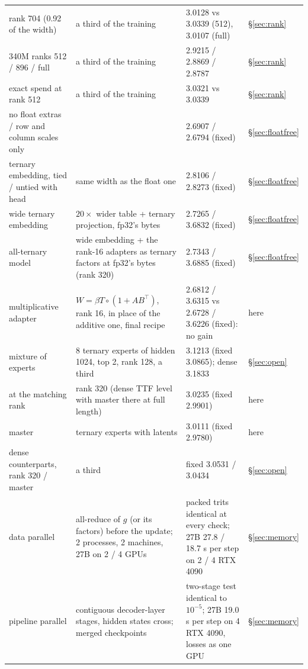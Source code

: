 \documentclass[10pt,twocolumn]{article}
\begin{document}
\begin{table}[t]
{\begin{tabular}{p{4.6cm}p{6.2cm}p{4.6cm}l}
rank 704 (0.92 of the width) & a third of the training & 3.0128 vs 3.0339 (512), 3.0107 (full) & \S\ref{sec:rank} \\
340M ranks 512 / 896 / full & a third of the training & 2.9215 / 2.8869 / 2.8787 & \S\ref{sec:rank} \\
exact spend at rank 512 & a third of the training & 3.0321 vs 3.0339 & \S\ref{sec:rank} \\
no float extras / row and column scales only & & 2.6907 / 2.6794 (fixed) & \S\ref{sec:floatfree} \\
ternary embedding, tied / untied with head & same width as the float one & 2.8106 / 2.8273 (fixed) & \S\ref{sec:floatfree} \\
wide ternary embedding & $20\times$ wider table + ternary projection, fp32's bytes & 2.7265 / 3.6832 (fixed) & \S\ref{sec:floatfree} \\
all-ternary model & wide embedding + the rank-16 adapters as ternary factors at fp32's bytes (rank 320) & 2.7343 / 3.6885 (fixed) & \S\ref{sec:floatfree} \\
multiplicative adapter & $W=\beta T\circ(1+AB^\top)$, rank 16, in place of the additive one, final recipe & 2.6812 / 3.6315 vs 2.6728 / 3.6226 (fixed): no gain & here \\
mixture of experts & 8 ternary experts of hidden 1024, top 2, rank 128, a third & 3.1213 (fixed 3.0865); dense 3.1833 & \S\ref{sec:open} \\
\quad at the matching rank & rank 320 (dense TTF level with master there at full length) & 3.0235 (fixed 2.9901) & here \\
\quad master & ternary experts with latents & 3.0111 (fixed 2.9780) & here \\
\quad dense counterparts, rank 320 / master & a third & fixed 3.0531 / 3.0434 & \S\ref{sec:open} \\
data parallel & all-reduce of $g$ (or its factors) before the update; 2 processes, 2 machines, 27B on 2 / 4 GPUs & packed trits identical at every check; 27B 27.8 / 18.7 s per step on 2 / 4 RTX 4090 & \S\ref{sec:memory} \\
pipeline parallel & contiguous decoder-layer stages, hidden states cross; merged checkpoints & two-stage test identical to $10^{-5}$; 27B 19.0 s per step on 4 RTX 4090, losses as one GPU & \S\ref{sec:memory} \\
\bottomrule
\end{tabular}}
\end{table}
\end{document}
